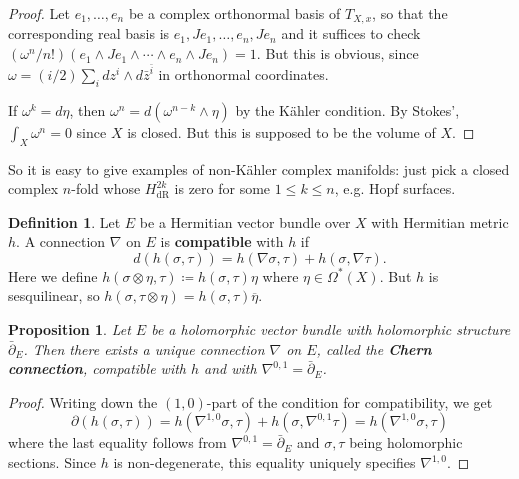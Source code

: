 \documentclass{report}
\theoremstyle{plain}
\newtheorem{proposition}[theorem]{Proposition}
\theoremstyle{definition}
\newtheorem{definition}[theorem]{Definition}
\theoremstyle{remark}
\newcommand{\di}{\partial}
\newcommand{\dR}{\mathrm{dR}}
\newcommand{\bz}{\bar{z}}
\newcommand{\bdi}{\bar{\di}}
\begin{document}
\begin{proof}
  Let $e_1, \ldots, e_n$ be a complex orthonormal basis of $T_{X,x}$,
  so that the corresponding real basis is $e_1, Je_1, \ldots, e_n,
  Je_n$ and it suffices to check $(\omega^n/n!)(e_1 \wedge Je_1 \wedge
  \cdots \wedge e_n \wedge Je_n) = 1$. But this is obvious, since
  $\omega = (i/2)\sum_i dz^i \wedge d\bz^{\bar{i}}$ in orthonormal
  coordinates.

  If $\omega^k = d\eta$, then $\omega^n = d(\omega^{n-k} \wedge \eta)$
  by the K\"ahler condition. By Stokes', $\int_X \omega^n = 0$ since
  $X$ is closed. But this is supposed to be the volume of $X$.
\end{proof}

So it is easy to give examples of non-K\"ahler complex manifolds: just
pick a closed complex $n$-fold whose $H^{2k}_{\dR}$ is zero for some
$1 \le k \le n$, e.g. Hopf surfaces.

\begin{definition}
  Let $E$ be a Hermitian vector bundle over $X$ with Hermitian metric
  $h$. A connection $\nabla$ on $E$ is {\bf compatible} with $h$ if
  \[ d(h(\sigma, \tau)) = h(\nabla \sigma, \tau) + h(\sigma, \nabla \tau). \]
  Here we define $h(\sigma \otimes \eta, \tau) \coloneqq h(\sigma,
  \tau) \eta$ where $\eta \in \Omega^*(X)$. But $h$ is sesquilinear,
  so $h(\sigma, \tau \otimes \eta) = h(\sigma, \tau) \overline{\eta}$.
\end{definition}

\begin{proposition}
  Let $E$ be a holomorphic vector bundle with holomorphic structure
  $\bdi_E$. Then there exists a unique connection $\nabla$ on $E$,
  called the {\bf Chern connection}, compatible with $h$ and with
  $\nabla^{0,1} = \bdi_E$.
\end{proposition}

\begin{proof}
  Writing down the $(1,0)$-part of the condition for compatibility, we
  get
  \[ \di(h(\sigma, \tau)) = h(\nabla^{1,0}\sigma, \tau) + h(\sigma, \nabla^{0,1}\tau) = h(\nabla^{1,0}\sigma, \tau) \]
  where the last equality follows from $\nabla^{0,1} = \bdi_E$ and
  $\sigma, \tau$ being holomorphic sections. Since $h$ is
  non-degenerate, this equality uniquely specifies $\nabla^{1,0}$.
\end{proof}
\end{document}
